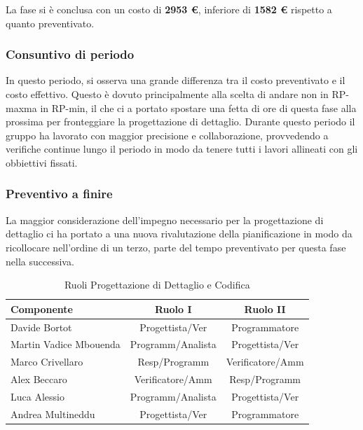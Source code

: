\documentclass[a4paper,11pt]{article}
\begin{document}
La fase si è conclusa con un costo di \textbf{2953 \euro}, inferiore di \textbf{1582 \euro} rispetto a quanto preventivato.
	\subsubsection{Consuntivo di periodo}
	In questo periodo, si osserva una grande differenza tra il costo preventivato e il costo effettivo. 
	  Questo è dovuto principalmente alla scelta di andare non in RP-max\addglos ma in RP-min\addglos, il che ci a portato spostare una fetta di ore di questa fase alla prossima per fronteggiare la progettazione di dettaglio. Durante questo periodo il gruppo ha lavorato con maggior precisione e collaborazione, provvedendo a verifiche continue lungo il periodo in modo da tenere tutti i lavori allineati con gli obbiettivi fissati.  
	
	
	\subsubsection{Preventivo a finire}
		La maggior considerazione dell'impegno necessario per la progettazione di dettaglio ci ha portato a una nuova rivalutazione della pianificazione in modo da ricollocare nell'ordine di un terzo, parte del tempo preventivato per questa fase nella successiva.
		\begin{table}[h!]			
		\begin{center}
			\begin{tabular}{l c c}
			\textbf{Componente} & \textbf{Ruolo I} & \textbf{Ruolo II} \\
			\midrule
			Davide Bortot & Progettista/Ver & Programmatore\\
			Martin Vadice Mbouenda & Programm/Analista & Progettista/Ver\\
			Marco Crivellaro & Resp/Programm & Verificatore/Amm\\
			Alex Beccaro & Verificatore/Amm & Resp/Programm\\
			Luca Alessio & Programm/Analista & Progettista/Ver\\
			Andrea Multineddu & Progettista/Ver & Programmatore\\
			\midrule
			\end{tabular}
		\end{center}
		\caption{Ruoli Progettazione di Dettaglio e Codifica}
		\end{table}
		
\end{document}

